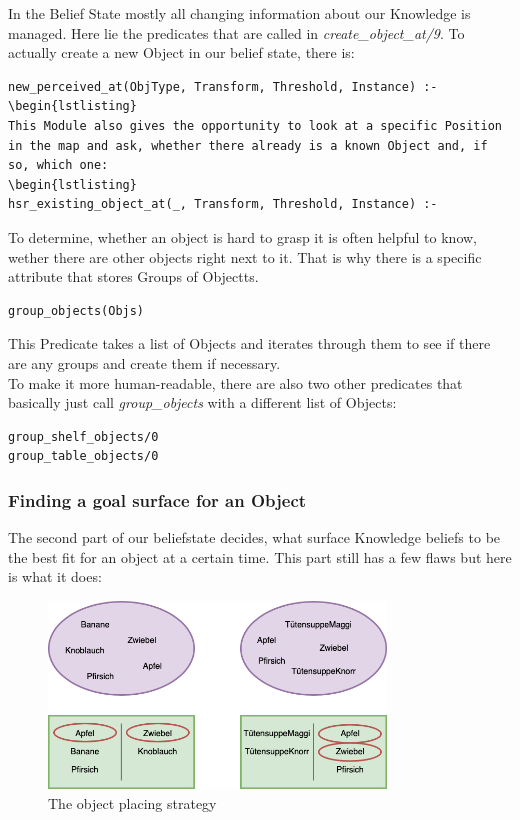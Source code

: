 \documentclass[main.tex]{subfiles}
\begin{document}
In the Belief State mostly all changing information about our Knowledge is managed. Here lie the predicates that are called in \textit{create\_object\_at/9}. To actually create a new Object in our belief state, there is:
\begin{lstlisting}
new_perceived_at(ObjType, Transform, Threshold, Instance) :-
\begin{lstlisting}
This Module also gives the opportunity to look at a specific Position in the map and ask, whether there already is a known Object and, if so, which one:
\begin{lstlisting}
hsr_existing_object_at(_, Transform, Threshold, Instance) :-
\end{lstlisting}
To determine, whether an object is hard to grasp it is often helpful to know, wether there are other objects right next to it. That is why there is a specific attribute that stores Groups of Objectts. 
\begin{lstlisting}
group_objects(Objs)
\end{lstlisting}
This Predicate takes a list of Objects and iterates through them to see if there are any groups and create them if necessary.\\
To make it more human-readable, there are also two other predicates that basically just call \textit{group\_objects} with a different list of Objects:
\begin{lstlisting}
group_shelf_objects/0
group_table_objects/0
\end{lstlisting}

\subsubsection{Finding a goal surface for an Object\label{sec:kn_find_surf}}

The second part of our beliefstate decides, what surface Knowledge beliefs to be the best fit for an object at a certain time. This part still has a few flaws but here is what it does:
\begin{figure}
\centering
\includegraphics[width=0.8\textwidth]{pictures/knowledge/knowledge_placing_objects}
\caption{The object placing strategy}
\label{fig:kn_obj_placement}
\end{figure}
\end{document}

